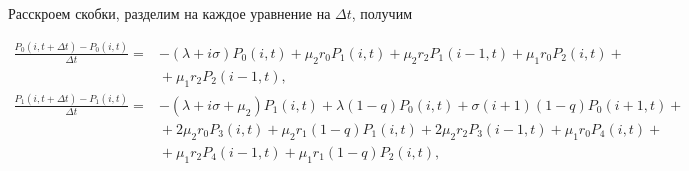 Расскроем скобки, разделим на каждое уравнение на $\Delta t$, получим
\begin{adjustwidth}{0pt}{0pt}
	\begin{align*} 
		\frac{P_{0}(i,t+\Delta t) - P_{0}(i, t)}{\Delta t}=&-(\lambda+i\sigma)P_{0}(i,t)+\mu_{2}r_{0}P_{1}(i,t)+\mu_{2}r_{2}P_{1}(i-1,t)+\mu_{1}r_{0}P_{2}(i,t)+\\
		&{}+\mu_{1}r_{2}P_{2}(i-1,t),\\
		\frac{P_{1}(i,t+\Delta t) - P_{1}(i, t)}{\Delta t}=&-(\lambda+i\sigma+\mu_{2})P_{1}(i,t)+\lambda(1-q)P_{0}(i,t)+\sigma(i+1)(1-q)P_{0}(i+1,t)+\\
		&{}+2\mu_{2}r_{0}P_{3}(i,t) + \mu_{2}r_{1}(1-q)P_{1}(i,t)+2\mu_{2}r_{2}P_{3}(i-1,t)+\mu_{1}r_{0}P_{4}(i,t)+\\
		&{}+\mu_{1}r_{2}P_{4}(i-1,t)+\mu_{1}r_{1}(1-q)P_{2}(i,t),\\
	\end{align*}
\end{adjustwidth}

